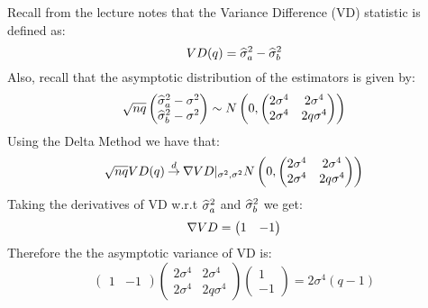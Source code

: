 \begin{solution}
    Recall from the lecture notes that the Variance Difference (VD) statistic is defined as:
    \[
        VD(q) = \widehat{\sigma}_a^2-\widehat{\sigma}_b^2
    \]
    Also, recall that the asymptotic distribution of the estimators is given by:
    \[
        \sqrt{nq}\begin{pmatrix}\widehat{\sigma}_a^2-\sigma^2 \\ \widehat{\sigma}_b^2- \sigma^2\end{pmatrix} \sim N\left( 0, \begin{pmatrix} 2\sigma^4 & 2\sigma^4 \\ 2\sigma^4 & 2q\sigma^4 \end{pmatrix} \right)  
    \]
    Using the Delta Method we have that:
    \[
        \sqrt{nq}VD(q) \mathbin{\overset{d}{\to}} \nabla VD\rvert_{\sigma^2, \sigma^2} N\left( 0, \begin{pmatrix} 2\sigma^4 & 2\sigma^4 \\ 2\sigma^4 & 2q\sigma^4 \end{pmatrix} \right)
    \]
    Taking the derivatives of VD w.r.t \(\widehat{\sigma}_a^2\) and \(\widehat{\sigma}_b^2\) we get:
    \[
        \nabla VD = \begin{pmatrix}
            1 & -1
        \end{pmatrix}
    \]
    Therefore the the asymptotic variance of VD is:
    \[
        \begin{pmatrix}1 & -1\end{pmatrix}\begin{pmatrix} 2\sigma^4 & 2\sigma^4 \\ 2\sigma^4 & 2q\sigma^4 \end{pmatrix}\begin{pmatrix}1 \\ -1\end{pmatrix} = 2\sigma^4(q-1)
    \]
\end{solution}
